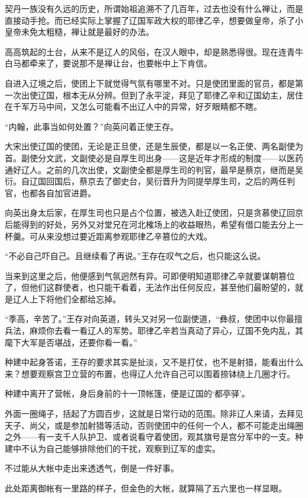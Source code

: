 契丹一族没有久远的历史，所谓始祖追溯不了几百年，过去也没有什么禅让，而是直接动手抢。而已经实际上掌握了辽国军政大权的耶律乙辛，想要做皇帝，杀了小皇帝未免太粗糙，禅让就是最好的办法。

高高筑起的土台，从来不是辽人的风俗，在汉人眼中，却是熟悉得很。现在连青牛白马都牵来了，要说那不是禅让台，也要帐中上下肯信。

自进入辽境之后，使团上下就觉得气氛有哪里不对。只是使团里面的官员，都是第一次出使辽国，根本无从分辨。但到了永平淀，拜见了耶律乙辛和辽国幼主，居住在千军万马中间，又怎么可能看不出辽人中的异常，好歹眼睛都不瞎。

“内翰，此事当如何处置？”向英问着正使王存。

大宋出使辽国的使团，无论是正旦使，还是生辰使，都是以一名正使、两名副使为首。副使分文武，文副使必是自厚生司出身——这是近年才形成的制度——以医药通好辽人。之前的几次出使，文副使全都是厚生司的判官，最早是蔡京，继而是吴衍。自辽国回国后，蔡京去了御史台，吴衍晋升为同提举厚生司，之后的两任判官，也都各自加官进爵。

向英出身太后家，在厚生司也只是占个位置，被选入赴辽使团，只是贪慕使辽回京后能得到的好处，另外又对堂兄在河北榷场上的收益眼热，希望有借口能去分上一杯羹。可从来没想过要近距离参观耶律乙辛篡位的大戏。

“不必自己吓自己。且继续看了再说。”王存在叹气之后，也只能这么说。

当来到这里之后，他便感到气氛迥然有异。可即便明知道耶律乙辛就要谋朝篡位了，但他们这群使者，也只能干看着，无法作出任何反应，甚至他们最盼望的，就是辽人上下将他们全都给忘掉。

“季高，辛苦了。”王存对向英道，转头又对另一位副使道，“彝叔，使团中以你最擅兵法，麻烦你去看一看辽人的军势。耶律乙辛若当真动了异心，辽国不免内乱，其麾下大军是否堪战，还要你看一看。”

种建中起身答诺，王存的要求其实是扯淡，又不是打仗，也不是射猎，能看出什么来？想要观察宫卫立营的布置，也得辽人允许自己可以围着捺钵绕上几圈才行。

种建中离开了营帐，身后身前的十一顶帐篷，便是辽国的‘都亭驿’。

外面一圈绳子，括起了方圆百步，这就是日常行动的范围。除非辽人来请，去拜见天子、尚父，或是参加射猎等活动，否则使团中的任何一个人，都不可能走出绳圈之外——有一支千人队护卫、或者说看守着使团，观其旗号是宫分军中的一支。种建中不认为自己能够排除他们的干扰，观察到辽军的虚实。

不过能从大帐中走出来透透气，倒是一件好事。

此处距离御帐有一里路的样子，但金色的大帐，就算隔了五六里也一样显眼。

